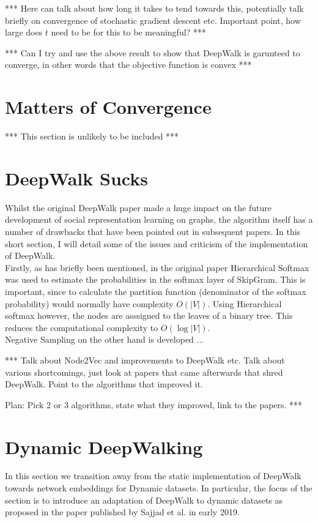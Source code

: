 \documentclass[a4paper]{article}
\begin{document}
*** Here can talk about how long it takes to tend towards this, potentially talk
briefly on convergence of stochastic gradient descent etc. Important point, how
large does $t$ need to be for this to be meaningful? ***

*** Can I try and use the above result to show that DeepWalk is garunteed to
converge, in other words that the objective function is convex ***

\section{Matters of Convergence}

*** This section is unlikely to be included ***
\section{DeepWalk Sucks}
Whilst the original DeepWalk paper made a huge impact on the future development
of social representation learning on graphs, the algorithm itself has a number
of drawbacks that have been pointed out in subsequent papers. In this short
section, I will detail some of the issues and criticism of the implementation of DeepWalk.\\

Firstly, as has briefly been mentioned, in the original paper Hierarchical
Softmax was used to estimate the probabilities in the softmax layer of SkipGram.
This is important, since to calculate the partition function (denominator of the
softmax probability) would normally have complexity $O(|V|)$. Using Hierarchical
softmax however, the nodes are asssigned to the leaves of a binary tree. This
reduces the computational complexity to $O(\log{|V|})$.\\

Negative Sampling on the other hand is developed ...

*** Talk about Node2Vec and improvements to DeepWalk etc. Talk about various
shortcomings, just look at papers that came afterwards that shred DeepWalk.
Point to the algorithms that improved it.

Plan: Pick 2 or 3 algorithms, state what they improved, link to the papers.
***
\section{Dynamic DeepWalking}
In this section we transition away from the static implementation of DeepWalk
towards network embeddings for Dynamic datasets. In particular, the focus of the
section is to introduce an adaptation of DeepWalk to dynamic datasets as
proposed in the paper published by Sajjad et al.\cite{sajjad2019} in early
2019.\\
\end{document}
